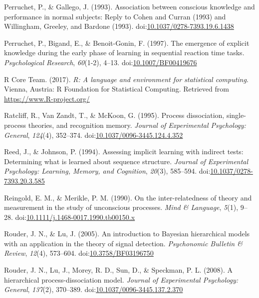 \documentclass[man]{apa6}
\theoremstyle{definition}
\theoremstyle{definition}
\theoremstyle{definition}
\theoremstyle{remark}
\begin{document}
\hypertarget{ref-perruchet_association_1993}{}
Perruchet, P., \& Gallego, J. (1993). Association between conscious
knowledge and performance in normal subjects: Reply to Cohen and Curran
(1993) and Willingham, Greeley, and Bardone (1993).
doi:\href{https://doi.org/10.1037/0278-7393.19.6.1438}{10.1037/0278-7393.19.6.1438}

\hypertarget{ref-perruchet_emergence_1997}{}
Perruchet, P., Bigand, E., \& Benoit-Gonin, F. (1997). The emergence of
explicit knowledge during the early phase of learning in sequential
reaction time tasks. \emph{Psychological Research}, \emph{60}(1-2),
4--13. doi:\href{https://doi.org/10.1007/BF00419676}{10.1007/BF00419676}

\hypertarget{ref-R-base}{}
R Core Team. (2017). \emph{R: A language and environment for statistical
computing}. Vienna, Austria: R Foundation for Statistical Computing.
Retrieved from \url{https://www.R-project.org/}

\hypertarget{ref-ratcliff_process_1995}{}
Ratcliff, R., Van Zandt, T., \& McKoon, G. (1995). Process dissociation,
single-process theories, and recognition memory. \emph{Journal of
Experimental Psychology: General}, \emph{124}(4), 352--374.
doi:\href{https://doi.org/10.1037/0096-3445.124.4.352}{10.1037/0096-3445.124.4.352}

\hypertarget{ref-reed_assessing_1994}{}
Reed, J., \& Johnson, P. (1994). Assessing implicit learning with
indirect tests: Determining what is learned about sequence structure.
\emph{Journal of Experimental Psychology: Learning, Memory, and
Cognition}, \emph{20}(3), 585--594.
doi:\href{https://doi.org/10.1037/0278-7393.20.3.585}{10.1037/0278-7393.20.3.585}

\hypertarget{ref-reingold_inter-relatedness_1990}{}
Reingold, E. M., \& Merikle, P. M. (1990). On the inter-relatedness of
theory and measurement in the study of unconscious processes. \emph{Mind
\& Language}, \emph{5}(1), 9--28.
doi:\href{https://doi.org/10.1111/j.1468-0017.1990.tb00150.x}{10.1111/j.1468-0017.1990.tb00150.x}

\hypertarget{ref-rouder_introduction_2005}{}
Rouder, J. N., \& Lu, J. (2005). An introduction to Bayesian
hierarchical models with an application in the theory of signal
detection. \emph{Psychonomic Bulletin \& Review}, \emph{12}(4),
573--604.
doi:\href{https://doi.org/10.3758/BF03196750}{10.3758/BF03196750}

\hypertarget{ref-rouder_hierarchical_2008}{}
Rouder, J. N., Lu, J., Morey, R. D., Sun, D., \& Speckman, P. L. (2008).
A hierarchical process-dissociation model. \emph{Journal of Experimental
Psychology: General}, \emph{137}(2), 370--389.
doi:\href{https://doi.org/10.1037/0096-3445.137.2.370}{10.1037/0096-3445.137.2.370}
\end{document}
